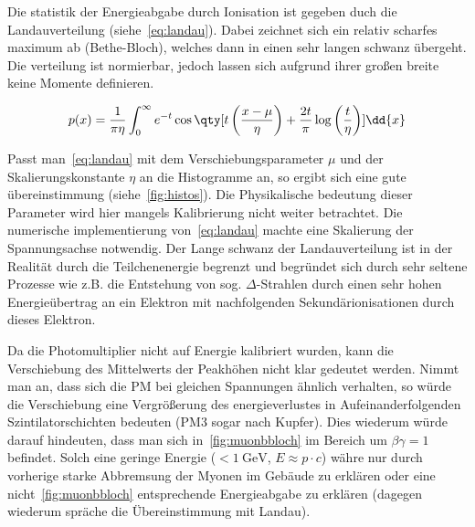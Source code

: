 \documentclass[slug=LM, room=Andreas-Schubert-Bau\,\ K\ 1A, supervisor=Anne-Sophie\ Berthold, coursedate=13.\ 12.\ 2019]{../../Lab_Report_LaTeX/lab_report}
\begin{document}
Die statistik der Energieabgabe durch Ionisation ist gegeben duch die
Landauverteilung (siehe~\ref{eq:landau}).\cite{Landau:216256} Dabei
zeichnet sich ein relativ scharfes maximum ab (Bethe-Bloch), welches
dann in einen sehr langen schwanz \"ubergeht. Die verteilung ist
normierbar, jedoch lassen sich aufgrund ihrer gro\ss{}en breite keine
Momente definieren.

\begin{equation}
  \label{eq:landau}
  p(x) = {\frac{1}{\pi \eta}}\int _{0}^{\infty }e^{-t}\cos \qty[t\left({\frac {x-\mu }{\eta}}\right)+{\frac {2t}{\pi }}\log \left({\frac {t}{\eta}}\right)]\dd{x}
\end{equation}

Passt man~\ref{eq:landau} mit dem Verschiebungsparameter \(\mu\) und
der Skalierungskonstante \(\eta\) an die Histogramme an, so ergibt
sich eine gute \"ubereinstimmung (siehe~\ref{fig:histos}). Die
Physikalische bedeutung dieser Parameter wird hier mangels
Kalibrierung nicht weiter betrachtet. Die numerische implementierung
von~\ref{eq:landau} machte eine Skalierung der Spannungsachse
notwendig. Der Lange schwanz der Landauverteilung ist in der
Realit\"at durch die Teilchenenergie begrenzt und begr\"undet sich
durch sehr seltene Prozesse wie z.B. die Entstehung von
sog. \(\Delta\)-Strahlen durch einen sehr hohen Energie\"ubertrag
an ein Elektron mit nachfolgenden Sekund\"arionisationen durch dieses
Elektron.

Da die Photomultiplier nicht auf Energie kalibriert wurden, kann die
Verschiebung des Mittelwerts der Peakh\"ohen nicht klar gedeutet
werden. Nimmt man an, dass sich die PM bei gleichen Spannungen
\"ahnlich verhalten, so w\"urde die Verschiebung eine
Vergr\"o\ss{}erung des energieverlustes in Aufeinanderfolgenden
Szintilatorschichten bedeuten (PM3 sogar nach Kupfer). Dies wiederum
w\"urde darauf hindeuten, dass man sich in~\ref{fig:muonbbloch} im
Bereich um \(\beta\gamma = 1\) befindet. Solch eine geringe Energie
(\(<\SI{1}{\giga\electronvolt}\), \(E\approx p\cdot c\)) w\"ahre nur
durch vorherige starke Abbremsung der Myonen im Geb\"aude zu
erkl\"aren oder eine nicht~\ref{fig:muonbbloch} entsprechende
Energieabgabe zu erkl\"aren (dagegen wiederum spr\"ache die
\"Ubereinstimmung mit Landau).
\end{document}
